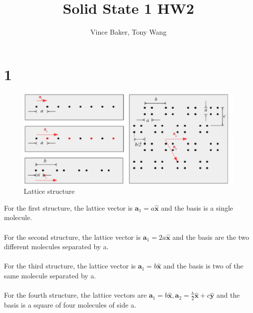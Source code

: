 \documentclass[a4paper,11pt]{article}
\title{Solid State 1 HW2}
\author{Vince Baker, Tony Wang}
\numberwithin{equation}{section}
\newcommand{\bv}[1]{\mathbf{#1}}
\begin{document}
\maketitle

\section*{1}
\begin{figure}[h]
 \caption{Lattice structure}
 \centering
   \includegraphics[width=\textwidth]{p1}
\end{figure}
For the first structure, the lattice vector is $\bv{a}_1=a\bv{\hat{x}}$ and the basis is a single molecule.\\
\\
For the second structure, the lattice vector is $\bv{a}_1=2a\bv{\hat{x}}$ and the basis are the two different molecules separated by a.\\
\\
For the third structure, the lattice vector is $\bv{a}_1=b\bv{\hat{x}}$ and the basis is two of the same molecule separated by a.\\
\\
For the fourth structure, the lattice vectors are $\bv{a}_1=b\bv{\hat{x}}, \bv{a}_2=\frac{b}{2}\bv{\hat{x}}+c\bv{\hat{y}} $ and the basis is a square of four molecules of side a.\\
\end{document}
